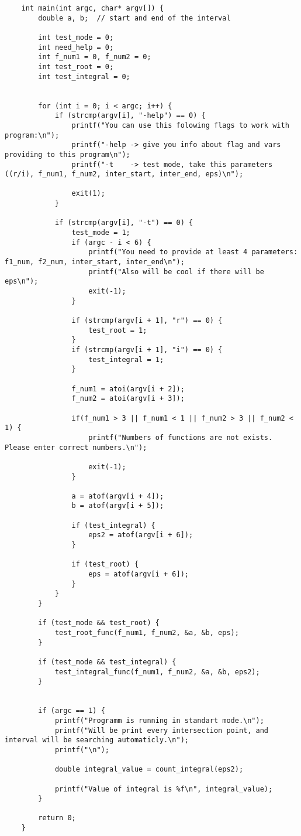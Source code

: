 \documentclass[a4paper,12pt,titlepage,finall]{article}
\begin{document}
\begin{verbatim}
    int main(int argc, char* argv[]) {
        double a, b;  // start and end of the interval
    
        int test_mode = 0;
        int need_help = 0;
        int f_num1 = 0, f_num2 = 0;
        int test_root = 0;
        int test_integral = 0;
    
    
        for (int i = 0; i < argc; i++) {
            if (strcmp(argv[i], "-help") == 0) {
                printf("You can use this folowing flags to work with program:\n");
                printf("-help -> give you info about flag and vars providing to this program\n");
                printf("-t    -> test mode, take this parameters ((r/i), f_num1, f_num2, inter_start, inter_end, eps)\n");
    
                exit(1);
            }
    
            if (strcmp(argv[i], "-t") == 0) {
                test_mode = 1;
                if (argc - i < 6) {
                    printf("You need to provide at least 4 parameters: f1_num, f2_num, inter_start, inter_end\n");
                    printf("Also will be cool if there will be eps\n");
                    exit(-1);
                }
    
                if (strcmp(argv[i + 1], "r") == 0) {
                    test_root = 1;
                }
                if (strcmp(argv[i + 1], "i") == 0) {
                    test_integral = 1;
                }
    
                f_num1 = atoi(argv[i + 2]);
                f_num2 = atoi(argv[i + 3]);
    
                if(f_num1 > 3 || f_num1 < 1 || f_num2 > 3 || f_num2 < 1) {
                    printf("Numbers of functions are not exists. Please enter correct numbers.\n");
    
                    exit(-1);
                }
    
                a = atof(argv[i + 4]);
                b = atof(argv[i + 5]);
    
                if (test_integral) {
                    eps2 = atof(argv[i + 6]);
                }
    
                if (test_root) {
                    eps = atof(argv[i + 6]);
                }
            }
        }
    
        if (test_mode && test_root) {
            test_root_func(f_num1, f_num2, &a, &b, eps);
        }
    
        if (test_mode && test_integral) {
            test_integral_func(f_num1, f_num2, &a, &b, eps2);
        }
    
    
        if (argc == 1) {
            printf("Programm is running in standart mode.\n");
            printf("Will be print every intersection point, and interval will be searching automaticly.\n");
            printf("\n");
    
            double integral_value = count_integral(eps2);
    
            printf("Value of integral is %f\n", integral_value);
        }
    
        return 0;
    }
\end{verbatim}
\end{document}
